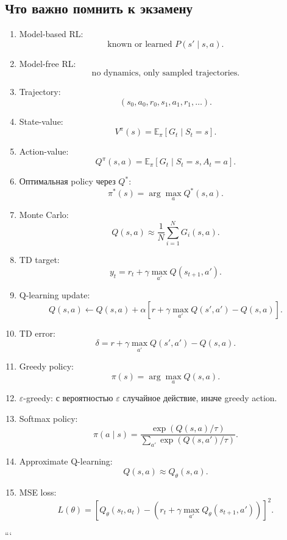 \documentclass[a4paper,12pt]{article}
\begin{document}
\subsection{Что важно помнить к экзамену}

\begin{enumerate}
    \item Model-based RL:
    \[
    \text{known or learned } P(s'\mid s,a).
    \]

    \item Model-free RL:
    \[
    \text{no dynamics, only sampled trajectories}.
    \]

    \item Trajectory:
    \[
    (s_0,a_0,r_0,s_1,a_1,r_1,\dots).
    \]

    \item State-value:
    \[
    V^\pi(s)=\mathbb{E}_\pi[G_t\mid S_t=s].
    \]

    \item Action-value:
    \[
    Q^\pi(s,a)=\mathbb{E}_\pi[G_t\mid S_t=s,A_t=a].
    \]

    \item Оптимальная policy через \(Q^*\):
    \[
    \pi^*(s)=\arg\max_a Q^*(s,a).
    \]

    \item Monte Carlo:
    \[
    Q(s,a)
    \approx
    \frac{1}{N}
    \sum_{i=1}^{N}G_i(s,a).
    \]

    \item TD target:
    \[
    y_t
    =
    r_t+
    \gamma\max_{a'}Q(s_{t+1},a').
    \]

    \item Q-learning update:
    \[
    Q(s,a)
    \leftarrow
    Q(s,a)
    +
    \alpha
    \left[
    r+
    \gamma\max_{a'}Q(s',a')
    -
    Q(s,a)
    \right].
    \]

    \item TD error:
    \[
    \delta
    =
    r+
    \gamma\max_{a'}Q(s',a')
    -
    Q(s,a).
    \]

    \item Greedy policy:
    \[
    \pi(s)=\arg\max_a Q(s,a).
    \]

    \item \(\varepsilon\)-greedy:
    с вероятностью \(\varepsilon\) случайное действие, иначе greedy action.

    \item Softmax policy:
    \[
    \pi(a\mid s)
    =
    \frac{
    \exp(Q(s,a)/\tau)
    }{
    \sum_{a'}
    \exp(Q(s,a')/\tau)
    }.
    \]

    \item Approximate Q-learning:
    \[
    Q(s,a)\approx Q_\theta(s,a).
    \]

    \item MSE loss:
    \[
    L(\theta)
    =
    \left[
    Q_\theta(s_t,a_t)
    -
    \left(
    r_t+
    \gamma\max_{a'}Q_\theta(s_{t+1},a')
    \right)
    \right]^2.
    \]
\end{enumerate}
```
\end{document}
